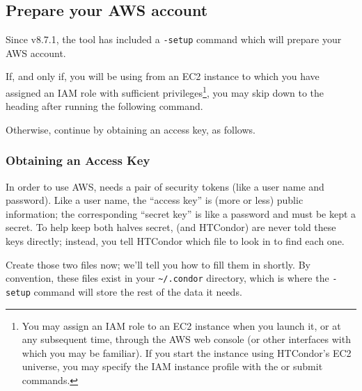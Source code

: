 
\subsection{Prepare your AWS account}

Since v8.7.1, the  tool has included a \texttt{-setup} command
which will prepare your AWS account.

If, and only if, you will be using  from an EC2 instance to
which you have assigned an IAM role with sufficient privileges\footnote{%
You may assign an IAM role to an EC2 instance when you launch it, or at
any subsequent time, through the AWS web console (or other interfaces with
which you may be familiar).  If you start the instance using HTCondor's
EC2 universe, you may specify the IAM instance profile with the
 or 
submit commands.}, you may skip down to the \textbf{}
heading after running the following command.


Otherwise, continue by obtaining an access key, as follows.

\subsubsection{Obtaining an Access Key}

In order to use AWS,  needs a pair of security tokens (like a
user name and password).  Like a user name, the ``access key'' is (more or
less) public information; the corresponding ``secret key'' is like a password
and must be kept a secret.  To help keep both halves secret,
 (and HTCondor) are never told these keys directly; instead, you
tell HTCondor which file to look in to find each one.

Create those two files now; we'll tell you how to fill them in shortly.  By
convention, these files exist in your \texttt{\textasciitilde{}/.condor}
directory, which is where the \texttt{-setup} command will store the rest of
the data it needs.

